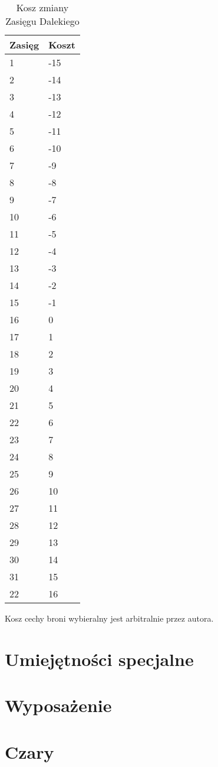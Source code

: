 \begin{table}[h]
\caption{Kosz zmiany Zasięgu Dalekiego}
    \begin{tabular}{|l|l|}
    \hline
    Zasięg & Koszt \\ \hline
    1 & -15  \\ 
    2 & -14 \\ 
    3 & -13 \\ 
    4 & -12 \\ 
    5 & -11 \\ 
    6 & -10 \\ 
    7 & -9 \\ 
    8 & -8 \\ 
    9 & -7 \\ 
    10 & -6 \\ 
    11 & -5 \\ 
    12 & -4 \\ 
    13 & -3 \\ 
    14 & -2 \\ 
    15 & -1 \\
    16 & 0 \\ 
    17 & 1 \\ 
    18 & 2 \\ 
    19 & 3 \\ 
    20 & 4 \\ 
    21 & 5 \\ 
    22 & 6 \\ 
    23 & 7 \\ 
    24 & 8 \\ 
    25 & 9 \\ 
    26 & 10 \\ 
    27 & 11 \\ 
    28 & 12 \\ 
    29 & 13 \\ 
    30 & 14 \\ 
    31 & 15 \\ 
    22 & 16 \\ 
    \end{tabular}
\end{table}


Kosz cechy broni wybieralny jest arbitralnie przez autora. 

\section{Umiejętności specjalne}

\section{Wyposażenie}

\section{Czary}